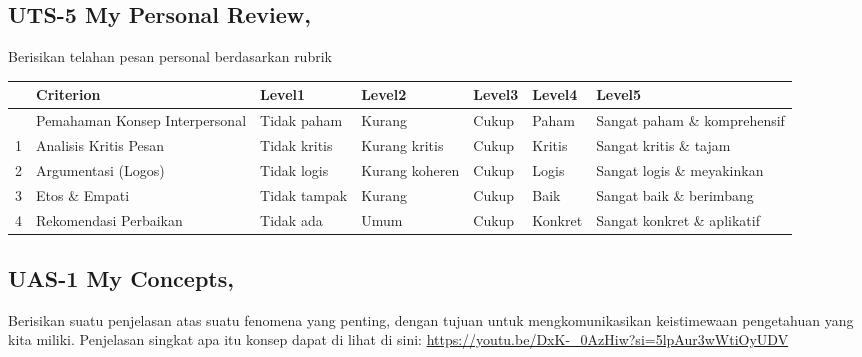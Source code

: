 \documentclass[
  letterpaper,
  DIV=11,
  numbers=noendperiod]{scrreprt}
\begin{document}
\subsection*{UTS-5 My Personal Review,}\label{uts-5-my-personal-review}

Berisikan telahan pesan personal berdasarkan rubrik

\begin{longtable}[]{@{}lllllll@{}}
\toprule\noalign{}
& Criterion & Level1 & Level2 & Level3 & Level4 & Level5 \\
\midrule\noalign{}
\endhead
\bottomrule\noalign{}
\endlastfoot
0 & Pemahaman Konsep Interpersonal & Tidak paham & Kurang & Cukup &
Paham & Sangat paham \& komprehensif \\
1 & Analisis Kritis Pesan & Tidak kritis & Kurang kritis & Cukup &
Kritis & Sangat kritis \& tajam \\
2 & Argumentasi (Logos) & Tidak logis & Kurang koheren & Cukup & Logis &
Sangat logis \& meyakinkan \\
3 & Etos \& Empati & Tidak tampak & Kurang & Cukup & Baik & Sangat baik
\& berimbang \\
4 & Rekomendasi Perbaikan & Tidak ada & Umum & Cukup & Konkret & Sangat
konkret \& aplikatif \\
\end{longtable}

\subsection*{UAS-1 My Concepts,}\label{uas-1-my-concepts}

Berisikan suatu penjelasan atas suatu fenomena yang penting, dengan
tujuan untuk mengkomunikasikan keistimewaan pengetahuan yang kita
miliki. Penjelasan singkat apa itu konsep dapat di lihat di sini:
\url{https://youtu.be/DxK-_0AzHiw?si=5lpAur3wWtiOyUDV}
\end{document}
